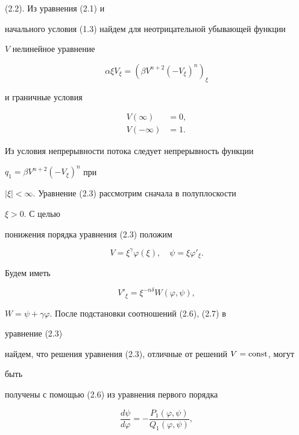 (2.2). Из уравнения (2.1) и 


начального условия (1.3) найдем для неотрицательной убывающей функции 


$V$ нелинейное уравнение 


\begin{equation} 


\alpha\xi V_\xi=(\beta V^{n+2}(-V_\xi)^n)_\xi \tag{2.3} 


\end{equation} 


и граничные условия 


\begin{align} 


V(\infty)&=0,\tag{2.4} \\ V(-\infty)&=1.\tag{2.5} 


\end{align} 


Из условия непрерывности потока следует непрерывность функции 


$q_1=\beta V^{n+2}(-V_\xi)^n$ при 


$|\xi|<\infty$. Уравнение (2.3) рассмотрим сначала в полуплоскости 


$\xi>0$. С целью 


понижения порядка уравнения (2.3) положим 


\begin{equation} 


V=\xi^\gamma \varphi(\xi),\quad \psi=\xi \varphi'_\xi.\tag{2.6} 


\end{equation} 


Будем иметь 


\begin{equation} 


V'_\xi=\xi^{-n\delta}W(\varphi,\psi),\tag{2.7} 


\end{equation} 


$W=\psi+\gamma\varphi$. После подстановки соотношений (2.6), (2.7) в 


уравнение (2.3) 


найдем, что решения уравнения (2.3), отличные от решений $V=\operatorname{const}$, могут 


быть 


получены с помощью (2.6) из уравнения первого порядка 


\begin{equation} 


\frac{d\psi}{d\varphi}= 


-\frac{P_1(\varphi,\psi)}{Q_1(\varphi,\psi)}, \tag{2.8} 


\end{equation} 


